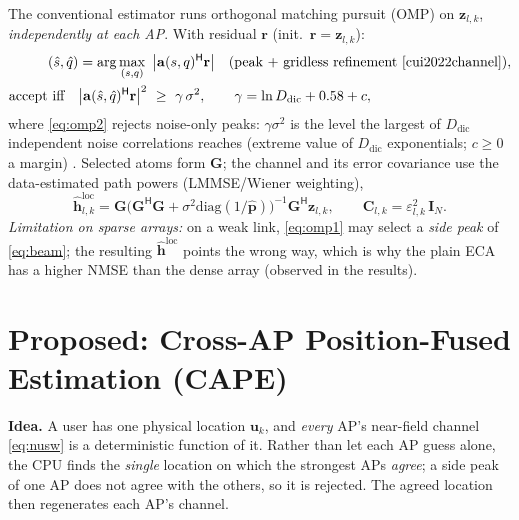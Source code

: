 \documentclass[11pt]{article}
\newcommand{\herm}{^{\mathsf{H}}}
\newcommand{\vh}{\mathbf{h}}
\newcommand{\vz}{\mathbf{z}}
\newcommand{\va}{\mathbf{a}}
\newcommand{\mC}{\mathbf{C}}
\newcommand{\mI}{\mathbf{I}}
\newcommand{\mG}{\mathbf{G}}
\begin{document}
The conventional estimator runs orthogonal matching pursuit (OMP)
\cite{tropp2007omp,cui2022channel} on $\vz_{l,k}$, \emph{independently at each AP}. With residual
$\mathbf r$ (init.\ $\mathbf r=\vz_{l,k}$):
\begin{align}
(\hat s,\hat q)&=\arg\max_{(s,q)}\ \big|\va(s,q)\herm\mathbf r\big|
  \quad\text{(peak + gridless refinement \cite{cui2022channel})},\label{eq:omp1}\\
\text{accept iff}\quad &\big|\va(\hat s,\hat q)\herm\mathbf r\big|^2\ \ge\ \gamma\,\sigma^2,
  \qquad \gamma=\ln D_{\mathrm{dic}}+0.58+c,\label{eq:omp2}
\end{align}
where \eqref{eq:omp2} rejects noise-only peaks: $\gamma\sigma^2$ is the level the largest of
$D_{\mathrm{dic}}$ independent noise correlations reaches (extreme value of $D_{\mathrm{dic}}$
exponentials; $c\!\ge\!0$ a margin) \cite{tropp2007omp}. Selected atoms form $\mG$; the channel and
its error covariance use the data-estimated path powers (LMMSE/Wiener weighting),
\begin{equation}
\hat{\vh}^{\mathrm{loc}}_{l,k}=\mG\big(\mG\herm\mG+\sigma^2\mathrm{diag}(1/\hat{\mathbf p})\big)^{-1}\mG\herm\vz_{l,k},
\qquad \mC_{l,k}=\varepsilon_{l,k}^2\,\mI_N .
\label{eq:loc}
\end{equation}
\emph{Limitation on sparse arrays:} on a weak link, \eqref{eq:omp1} may select a \emph{side peak}
of \eqref{eq:beam}; the resulting $\hat{\vh}^{\mathrm{loc}}$ points the wrong way, which is why the
plain ECA has a higher NMSE than the dense array (observed in the results).

\section{Proposed: Cross-AP Position-Fused Estimation (CAPE)}

\begin{contribbox}
\textbf{Idea.} A user has one physical location $\mathbf u_k$, and \emph{every} AP's near-field
channel \eqref{eq:nusw} is a deterministic function of it. Rather than let each AP guess alone, the
CPU finds the \emph{single} location on which the strongest APs \emph{agree}; a side peak of one AP
does not agree with the others, so it is rejected. The agreed location then regenerates each AP's
channel.
\end{contribbox}
\end{document}
